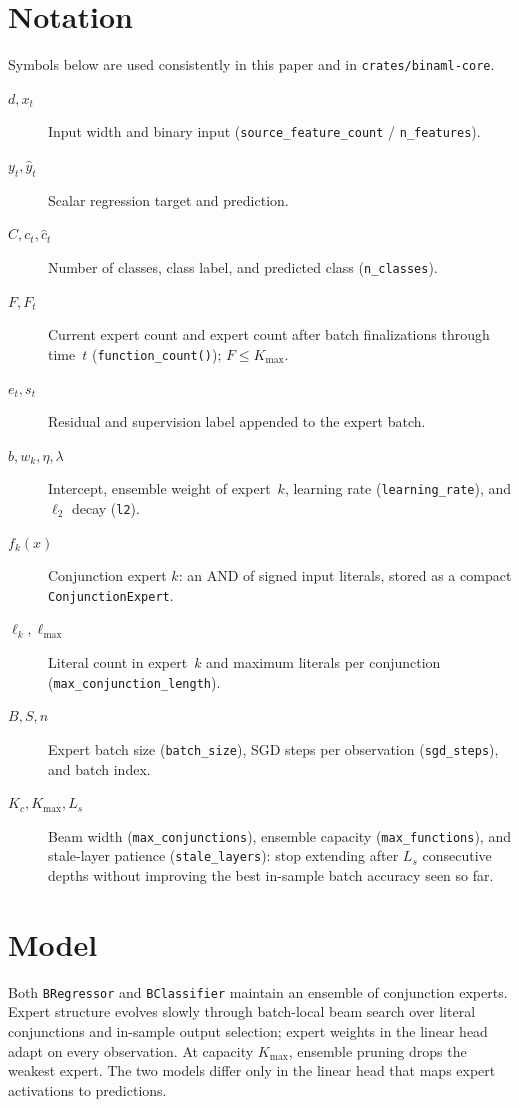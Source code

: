 \documentclass[11pt]{article}
\begin{document}
\section{Notation}
Symbols below are used consistently in this paper and in
\texttt{crates/binaml-core}.
\begin{description}
  \item[$d,x_t$] Input width and binary input
  (\texttt{source\_feature\_count} / \texttt{n\_features}).
  \item[$y_t,\hat y_t$] Scalar regression target and prediction.
  \item[$C,c_t,\hat c_t$] Number of classes, class label, and predicted class
  (\texttt{n\_classes}).
  \item[$F,F_t$] Current expert count and expert count after batch
  finalizations through time~$t$ (\texttt{function\_count()}); $F\leq K_{\max}$.
  \item[$e_t,s_t$] Residual and supervision label appended to the expert batch.
  \item[$b,w_k,\eta,\lambda$] Intercept, ensemble weight of expert~$k$,
  learning rate (\texttt{learning\_rate}), and $\ell_2$ decay (\texttt{l2}).
  \item[$f_k(x)$] Conjunction expert $k$: an AND of signed input literals, stored
  as a compact \texttt{ConjunctionExpert}.
  \item[$\ell_k,\ell_{\max}$] Literal count in expert~$k$ and maximum literals
  per conjunction (\texttt{max\_conjunction\_length}).
  \item[$B,S,n$] Expert batch size (\texttt{batch\_size}), SGD steps per
  observation (\texttt{sgd\_steps}), and batch index.
  \item[$K_c,K_{\max},L_s$] Beam width (\texttt{max\_conjunctions}), ensemble
  capacity (\texttt{max\_functions}), and stale-layer patience
  (\texttt{stale\_layers}): stop extending after $L_s$ consecutive depths
  without improving the best in-sample batch accuracy seen so far.
\end{description}

\section{Model}
Both \texttt{BRegressor} and \texttt{BClassifier} maintain an ensemble of
conjunction experts.  Expert structure evolves slowly through batch-local beam
search over literal conjunctions and in-sample output selection; expert weights
in the linear head adapt on every observation.  At capacity $K_{\max}$, ensemble
pruning drops the weakest expert.  The two models differ only in the linear head
that maps expert activations to predictions.
\end{document}
